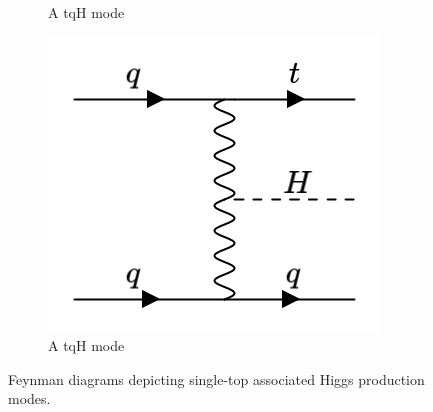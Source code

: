 \begin{figure}[htp]
\begin{subfigure}[b]{0.3\textwidth}
         \caption{A tqH mode}
         \label{fig:tqH1}
     \end{subfigure}
     \hfill
         \begin{subfigure}[b]{0.3\textwidth}
         \centering
         \includegraphics[width=\textwidth]{figures/theory_chapter/tqH2.png}
         \caption{A tqH mode}
         \label{fig:tqH2}
     \end{subfigure}
     \hfill 
  \label{fig:tHmodes}
  \caption{Feynman diagrams depicting single-top associated Higgs production modes.}  
\end{figure}

